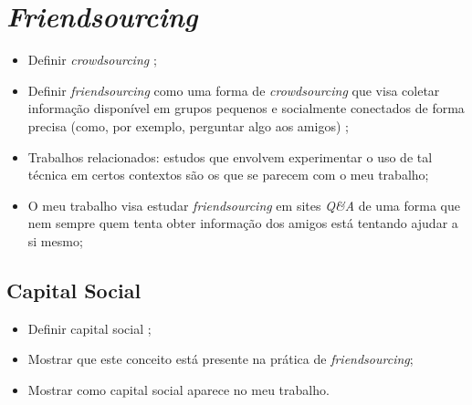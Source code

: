 \section{\textit{Friendsourcing}}
\begin{itemize}
    \item Definir \textit{crowdsourcing} \cite{brabham2008crowdsourcing};
    \item Definir \textit{friendsourcing} como uma forma de \textit{crowdsourcing} que visa coletar informação disponível em grupos pequenos e socialmente conectados de forma precisa (como, por exemplo, perguntar algo aos amigos) \cite{Bernstein:2008:PVF:1746259.1746260};
    \item Trabalhos relacionados: estudos que envolvem experimentar o uso de tal técnica em certos contextos são os que se parecem com o meu trabalho;
    \item O meu trabalho visa estudar \textit{friendsourcing} em sites \textit{Q\&A} de uma forma que nem sempre quem tenta obter informação dos amigos está tentando ajudar a si mesmo; 
  \end{itemize}
\subsection{Capital Social}
    \begin{itemize}
        \item Definir capital social \cite{portes2000social};
        \item Mostrar que este conceito está presente na prática de \textit{friendsourcing};
        \item Mostrar como capital social aparece no meu trabalho.
    \end{itemize}